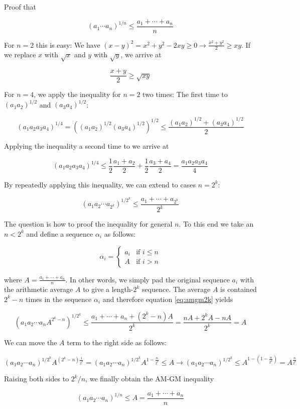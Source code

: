 
Proof that

\[
(a_1 \cdots a_n)^{1/n} \leq \frac{a_1 + \cdots + a_n}{n}
\]

For \(n=2\) this is easy: We have
\((x-y)^2 = x^2 + y^2 - 2xy \geq 0 \rightarrow \frac{x^2 + y^2}{2} \geq xy\).
If we replace \(x\) with \(\sqrt{x}\) and \(y\) with \(\sqrt{y}\), we
arrive at

\[
\frac{x + y}{2} \geq \sqrt{xy}
\]

For \(n=4\), we apply the inequality for \(n=2\) two times: The first
time to \((a_1 a_2)^{1/2}\) and \((a_3 a_4)^{1/2}\):

\[
(a_1 a_2 a_3 a_4)^{1/4} = \left( (a_1 a_2)^{1/2}(a_3 a_4)^{1/2} \right)^{1/2} \leq \frac{(a_1 a_2)^{1/2} + (a_3 a_4)^{1/2}}{2}
\]

Applying the inequality a second time to we arrive at

\[
(a_1 a_2 a_3 a_4)^{1/4} \leq \frac{1}{2} \frac{a_1 + a_2}{2} + \frac{1}{2} \frac{a_3 + a_4}{2} = \frac{a_1 a_2 a_3 a_4}{4}
\]

By repeatedly applying this inequality, we can extend to cases
\(n = 2^k\):

\begin{equation}
\label{eq:amgm2k}
(a_1 a_2 \cdots a_{2^k})^{1/2^k} \leq \frac{a_1 + \cdots + a_{2^k}}{2^k}
\end{equation}

The question is how to proof the inequality for general \(n\). To this
end we take an \(n < 2^k\) and define a sequence \(\alpha_i\) as
follows:

\[
\alpha_i = \begin{cases}
a_i & \mbox{if } i \leq n \\
A & \mbox{if } i > n \end{cases}
\]

where \(A = \frac{a_1 + \cdots + a_n}{n}\). In other words, we simply
pad the original sequence \(a_i\) with the arithmetic average \(A\) to
give a length-\(2^k\) sequence. The average \(A\) is contained
\(2^k - n\) times in the sequence \(\alpha_i\) and therefore equation
\eqref{eq:amgm2k} yields

\[
(a_1 a_2 \cdots a_n A^{2^k - n})^{1/2^k} \leq \frac{a_1 + \cdots + a_n + (2^k - n) A}{2^k} = \frac{nA + 2^k A - nA}{2^k} = A
\]

We can move the \(A\) term to the right side as follows:

\[
(a_1 a_2 \cdots a_n)^{1/2^k} A^{(2^k - n)\frac{1}{2^k}} = (a_1 a_2 \cdots a_n)^{1/2^k} A^{1 - \frac{n}{2^k}} \leq A \rightarrow (a_1 a_2 \cdots a_n)^{1/2^k} \leq A^{1 - (1 - \frac{n}{2^k})} = A^{\frac{n}{2^k}}
\]

Raising both sides to \(2^k / n\), we finally obtain the AM-GM
inequality

\[
(a_1 a_2 \cdots a_n)^{1/n} \leq A = \frac{a_1 + \cdots + a_n}{n}
\]
